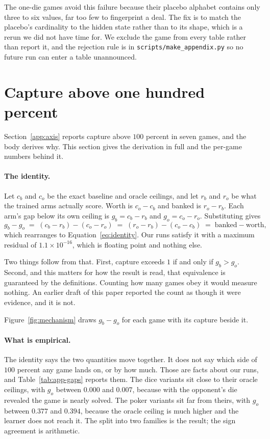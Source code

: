 \documentclass{article}
\begin{document}
The one-die games avoid this failure because their placebo alphabet contains only three to six values, far too few to fingerprint a deal. The fix is to match the placebo's cardinality to the hidden state rather than to its shape, which is a rerun we did not have time for. We exclude the game from every table rather than report it, and the rejection rule is in \texttt{scripts/make\_appendix.py} so no future run can enter a table unannounced.

\section{Capture above one hundred percent}
\label{app:mechanism}

Section~\ref{app:axis} reports capture above $100$ percent in seven games, and the body derives why. This section gives the derivation in full and the per-game numbers behind it.

\paragraph{The identity.} Let $c_b$ and $c_o$ be the exact baseline and oracle ceilings, and let $r_b$ and $r_o$ be what the trained arms actually score. Worth is $c_o - c_b$ and banked is $r_o - r_b$. Each arm's gap below its own ceiling is $g_b = c_b - r_b$ and $g_o = c_o - r_o$. Substituting gives
%
\[ g_b - g_o \;=\; (c_b - r_b) - (c_o - r_o) \;=\; (r_o - r_b) - (c_o - c_b) \;=\; \text{banked} - \text{worth}, \]
%
which rearranges to Equation~\eqref{eq:identity}. Our runs satisfy it with a maximum residual of $1.1 \times 10^{-16}$, which is floating point and nothing else.

Two things follow from that. First, capture exceeds $1$ if and only if $g_b > g_o$. Second, and this matters for how the result is read, that equivalence is guaranteed by the definitions. Counting how many games obey it would measure nothing. An earlier draft of this paper reported the count as though it were evidence, and it is not.

Figure~\ref{fig:mechanism} draws $g_b - g_o$ for each game with its capture beside it.

\paragraph{What is empirical.} The identity says the two quantities move together. It does not say which side of $100$ percent any game lands on, or by how much. Those are facts about our runs, and Table~\ref{tab:app-gaps} reports them. The dice variants sit close to their oracle ceilings, with $g_o$ between $0.000$ and $0.007$, because with the opponent's die revealed the game is nearly solved. The poker variants sit far from theirs, with $g_o$ between $0.377$ and $0.394$, because the oracle ceiling is much higher and the learner does not reach it. The split into two families is the result; the sign agreement is arithmetic.
\end{document}
